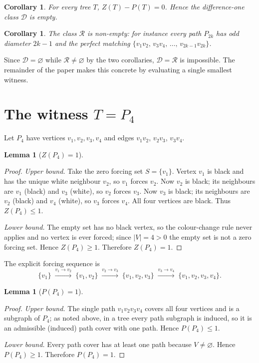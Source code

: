 \documentclass[11pt]{article}
\newtheorem{lemma}[theorem]{Lemma}
\newtheorem{corollary}[theorem]{Corollary}
\theoremstyle{definition}
\theoremstyle{remark}
\begin{document}
\begin{corollary}\label{cor:empty}
For every tree $T$, $Z(T)-P(T)=0$. Hence the difference-one class $\mathcal{D}$
is empty.
\end{corollary}

\begin{corollary}\label{cor:rhs-nonempty}
The class $\mathcal{R}$ is non-empty: for instance every path $P_{2k}$ has odd
diameter $2k-1$ and the perfect matching $\{v_1v_2,\,v_3v_4,\,\dots,\,v_{2k-1}v_{2k}\}$.
\end{corollary}

Since $\mathcal{D}=\varnothing$ while $\mathcal{R}\neq\varnothing$ by the two
corollaries, $\mathcal{D}=\mathcal{R}$ is impossible. The remainder of the paper
makes this concrete by evaluating a single smallest witness.

\section{The witness $T=P_4$}

Let $P_4$ have vertices $v_1,v_2,v_3,v_4$ and edges $v_1v_2$, $v_2v_3$,
$v_3v_4$.

\begin{lemma}[$Z(P_4)=1$]\label{lem:z}
\end{lemma}
\begin{proof}
\emph{Upper bound.} Take the zero forcing set $S=\{v_1\}$. Vertex $v_1$ is black
and has the unique white neighbour $v_2$, so $v_1$ forces $v_2$. Now $v_2$ is
black; its neighbours are $v_1$ (black) and $v_3$ (white), so $v_2$ forces
$v_3$. Now $v_3$ is black; its neighbours are $v_2$ (black) and $v_4$ (white),
so $v_3$ forces $v_4$. All four vertices are black. Thus $Z(P_4)\le 1$.

\emph{Lower bound.} The empty set has no black vertex, so the colour-change rule
never applies and no vertex is ever forced; since $|V|=4>0$ the empty set is not
a zero forcing set. Hence $Z(P_4)\ge 1$. Therefore $Z(P_4)=1$.
\end{proof}

The explicit forcing sequence is
\[
\{v_1\}\;\xrightarrow{v_1\to v_2}\;\{v_1,v_2\}\;
\xrightarrow{v_2\to v_3}\;\{v_1,v_2,v_3\}\;
\xrightarrow{v_3\to v_4}\;\{v_1,v_2,v_3,v_4\}.
\]

\begin{lemma}[$P(P_4)=1$]\label{lem:p}
\end{lemma}
\begin{proof}
\emph{Upper bound.} The single path $v_1v_2v_3v_4$ covers all four vertices and
is a subgraph of $P_4$; as noted above, in a tree every path subgraph is
induced, so it is an admissible (induced) path cover with one path. Hence
$P(P_4)\le 1$.

\emph{Lower bound.} Every path cover has at least one path because $V\neq
\varnothing$. Hence $P(P_4)\ge 1$. Therefore $P(P_4)=1$.
\end{proof}
\end{document}
